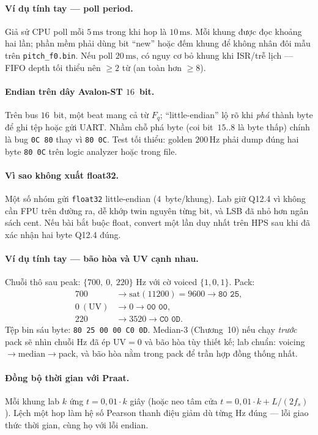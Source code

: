 \paragraph{Ví dụ tính tay --- poll period.} Giả sử CPU poll mỗi $5\,\text{ms}$ trong khi hop là $10\,\text{ms}$. Mỗi khung được đọc khoảng hai lần; phần mềm phải dùng bit ``new'' hoặc đếm khung để không nhân đôi mẫu trên \texttt{pitch\_f0.bin}. Nếu poll $20\,\text{ms}$, có nguy cơ bỏ khung khi ISR/trễ lịch --- FIFO depth tối thiểu nên $\ge 2$ từ (an toàn hơn $\ge 8$).

\paragraph{Endian trên dây Avalon-ST $16$~bit.} Trên bus $16$~bit, một beat mang cả từ $F_q$; ``little-endian'' lộ rõ khi \emph{phá} thành byte để ghi tệp hoặc gửi UART. Nhầm chỗ phá byte (coi bit~$15..8$ là byte thấp) chính là bug \texttt{0C 80} thay vì \texttt{80 0C}. Test tối thiểu: golden $200\,\text{Hz}$ phải dump đúng hai byte \texttt{80 0C} trên logic analyzer hoặc trong file.

\paragraph{Vì sao không xuất float32.} Một số nhóm gửi \texttt{float32} little-endian ($4$~byte/khung). Lab giữ Q12.4 vì không cần FPU trên đường ra, dễ khớp twin nguyên từng bit, và LSB đã nhỏ hơn ngân sách cent. Nếu bài bắt buộc float, convert một lần duy nhất trên HPS sau khi đã xác nhận hai byte Q12.4 đúng.

\paragraph{Ví dụ tính tay --- bão hòa và UV cạnh nhau.} Chuỗi thô sau peak: $\{700,\ 0,\ 220\}$ Hz với cờ voiced $\{1,0,1\}$. Pack:
\begin{align*}
700 &\to \mathrm{sat}(11200)=9600 \to \texttt{80 25},\\
0\ (\mathrm{UV}) &\to 0 \to \texttt{00 00},\\
220 &\to 3520 \to \texttt{C0 0D}.
\end{align*}
Tệp bin sáu byte: \texttt{80 25 00 00 C0 0D}. Median-3 (Chương~10) nếu chạy \emph{trước} pack sẽ nhìn chuỗi Hz đã ép UV$=0$ và bão hòa tùy thiết kế; lab chuẩn: voicing$\to$median$\to$pack, và bão hòa nằm trong pack để trần hợp đồng thống nhất.

\paragraph{Đồng bộ thời gian với Praat.} Mỗi khung lab $k$ ứng $t=0{,}01\cdot k$ giây (hoặc neo tâm cửa $t=0{,}01\cdot k + L/(2f_s)$). Lệch một hop làm hệ số Pearson thanh điệu giảm dù từng Hz đúng --- lỗi giao thức thời gian, cùng họ với lỗi endian.

